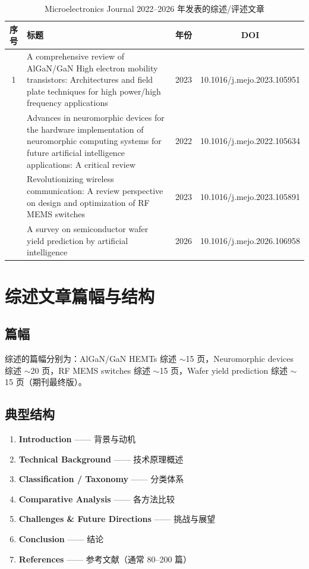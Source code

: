 \documentclass[11pt,a4paper]{article}
\renewcommand{\arraystretch}{1.15}
\begin{document}
\begin{table}[!htbp]
\centering
\small
\renewcommand{\arraystretch}{1.3}
\begin{tabularx}{\textwidth}{c>{\raggedright\arraybackslash}Xcc}
\toprule
\textbf{序号} & \textbf{标题} & \textbf{年份} & \textbf{DOI} \\
\midrule
1 & A comprehensive review of AlGaN/GaN High electron mobility transistors: Architectures and field plate techniques for high power/high frequency applications & 2023 & 10.1016/j.mejo.2023.105951 \\
\addlinespace
2 & Advances in neuromorphic devices for the hardware implementation of neuromorphic computing systems for future artificial intelligence applications: A critical review & 2022 & 10.1016/j.mejo.2022.105634 \\
\addlinespace
3 & Revolutionizing wireless communication: A review perspective on design and optimization of RF MEMS switches & 2023 & 10.1016/j.mejo.2023.105891 \\
\addlinespace
4 & A survey on semiconductor wafer yield prediction by artificial intelligence & 2026 & 10.1016/j.mejo.2026.106958 \\
\bottomrule
\end{tabularx}
\caption{Microelectronics Journal 2022--2026 年发表的综述/评述文章}
\end{table}

\section{综述文章篇幅与结构}

\subsection{篇幅}
\small
综述的篇幅分别为：AlGaN/GaN HEMTs 综述 $\sim$15 页，Neuromorphic devices 综述 $\sim$20 页，RF MEMS switches 综述 $\sim$15 页，Wafer yield prediction 综述 $\sim$15 页（期刊最终版）。

\subsection{典型结构}
\begin{enumerate}
    \item \textbf{Introduction} —— 背景与动机
    \item \textbf{Technical Background} —— 技术原理概述
    \item \textbf{Classification / Taxonomy} —— 分类体系
    \item \textbf{Comparative Analysis} —— 各方法比较
    \item \textbf{Challenges \& Future Directions} —— 挑战与展望
    \item \textbf{Conclusion} —— 结论
    \item \textbf{References} —— 参考文献（通常 80--200 篇）
\end{enumerate}
\end{document}
